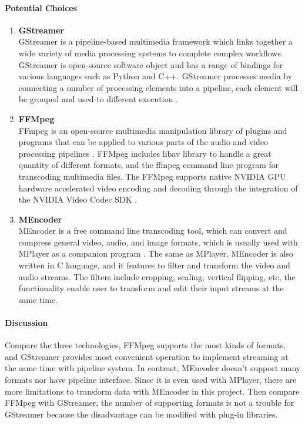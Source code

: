 \paragraph{Potential Choices}
\begin{enumerate}
\item\textbf{GStreamer}\\
GStreamer is a pipeline-based multimedia framework which links together a wide variety of media processing systems to complete complex workflows. GStreamer is open-source software object and has
 a range of bindings for various languages such as Python and C++. GStreamer processes media
  by connecting a number of processing elements into a pipeline, each element will be grouped and 
  used to different execution \cite{gstreamer}.\\

\item\textbf{FFMpeg}\\
FFmpeg is an open-source multimedia manipulation library of plugins and programs that can be applied to 
various parts of the audio and video processing pipelines \cite{ffmpeg}. FFMpeg includes libav library 
to handle a great quantity of different formats, and the ffmpeg command line program for transcoding 
multimedia files. The FFMpeg supports native NVIDIA GPU hardware accelerated video encoding and decoding 
through the integration of the NVIDIA Video Codec SDK \cite{nvidia}.\\

\item\textbf{MEncoder}\\
MEncoder is a free command line transcoding tool, which can convert and compress general video, audio, 
and image formats, which is usually used with MPlayer as a companion program \cite{mplay}. The same as MPlayer, 
MEncoder is also written in C language, and it features to filter and transform the video and audio 
streams. The filters include cropping, scaling, vertical flipping, etc, the functionality enable user to 
transform and edit their input streams at the same time.\\
\end{enumerate}

\paragraph{Discussion}
Compare the three technologies, FFMpeg supports the most kinds of formats, and GStreamer provides most 
convenient operation to implement streaming at the same time with pipeline system. In contrast, MEncoder 
doesn’t support many formats nor have pipeline interface. Since it is even used with MPlayer, there are 
more limitations to transform data with MEncoder in this project. Then compare FFMpeg with GStreamer, the 
number of supporting formats is not a trouble for GStreamer because the disadvantage can be modified with 
plug-in libraries.\\


